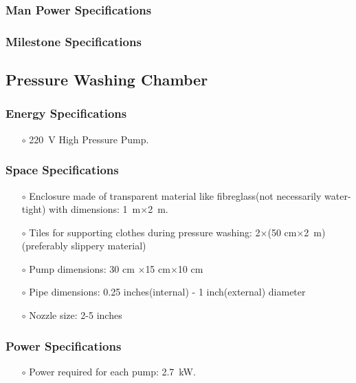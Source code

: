 \subsubsection{Man Power Specifications}

\subsubsection{Milestone Specifications}
\subsection{Pressure Washing Chamber}
\subsubsection{Energy Specifications}
\begin{itemize}
    \item[$\scriptstyle\circ$] \SI{220}{\volt} High Pressure Pump.
\end{itemize}
\subsubsection{Space Specifications}
\begin{itemize}
    \item[$\scriptstyle\circ$] Enclosure made of transparent material like fibreglass(not necessarily water-tight) with dimensions: \SI{1}{\meter}$\times$\SI{2}{\meter}.
\item[$\scriptstyle\circ$] Tiles for supporting clothes during pressure washing: 2$\times$(50 \unit{\centi\metre}$\times$\SI{2}{\meter}) (preferably slippery material)
    \item[$\scriptstyle\circ$] Pump dimensions: 30 \unit{\centi\metre} $\times$15 \unit{\centi\metre}$\times$10 \unit{\centi\metre}
    \item[$\scriptstyle\circ$] Pipe dimensions: 0.25 inches(internal) - 1 inch(external) diameter
    \item[$\scriptstyle\circ$] Nozzle size: 2-5 inches
\end{itemize}
\subsubsection{Power Specifications}
\begin{itemize}
    \item[$\scriptstyle\circ$] Power required for each pump: \SI{2.7}{\kilo\watt}.
\end{itemize}

